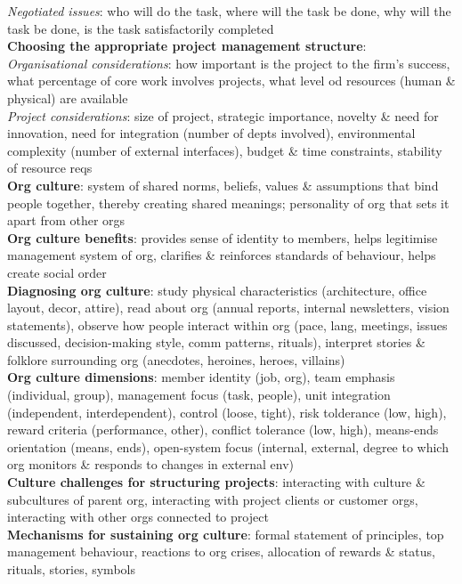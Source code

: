 \documentclass[a4paper]{article}
\begin{document}
\begin{multicols}{3}
        \textit{Negotiated issues}: who will do the task, where will the task be done, why will the task be done, is the task satisfactorily completed\\
        \textbf{Choosing the appropriate project management structure}:\\
        \textit{Organisational considerations}: how important is the project to the firm's success, what percentage of core work involves projects, what level od resources (human \& physical) are available\\
        \textit{Project considerations}: size of project, strategic importance, novelty \& need for innovation, need for integration (number of depts involved), environmental complexity (number of external interfaces), budget \& time constraints, stability of resource reqs\\
        \textbf{Org culture}: system of shared norms, beliefs, values \& assumptions that bind people together, thereby creating shared meanings; personality of org that sets it apart from other orgs\\
        \textbf{Org culture benefits}: provides sense of identity to members, helps legitimise management system of org, clarifies \& reinforces standards of behaviour, helps create social order\\
        \textbf{Diagnosing org culture}: study physical characteristics (architecture, office layout, decor, attire), read about org (annual reports, internal newsletters, vision statements), observe how people interact within org (pace, lang, meetings, issues discussed, decision-making style, comm patterns, rituals), interpret stories \& folklore surrounding org (anecdotes, heroines, heroes, villains)\\
        \textbf{Org culture dimensions}: member identity (job, org), team emphasis (individual, group), management focus (task, people), unit integration (independent, interdependent), control (loose, tight), risk tolderance (low, high), reward criteria (performance, other), conflict tolerance (low, high), means-ends orientation (means, ends), open-system focus (internal, external, degree to which org monitors \& responds to changes in external env)\\
        \textbf{Culture challenges for structuring projects}: interacting with culture \& subcultures of parent org, interacting with project clients or customer orgs, interacting with other orgs connected to project\\
        \textbf{Mechanisms for sustaining org culture}: formal statement of principles, top management behaviour, reactions to org crises, allocation of rewards \& status, rituals, stories, symbols\\

\end{multicols}
\end{document}
